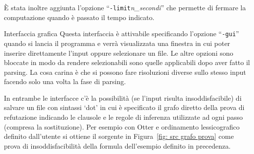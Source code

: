 \documentclass[a4paper,11pt]{article} %
\newcommand{\sintassi}{\texttt}
\begin{document}
\`E stata inoltre aggiunta l'opzione ``\sintassi{-limit}\emph{n\_secondi}'' che permette 
di fermare la computazione quando è passato il tempo indicato.


\begin{subsection}{Interfaccia grafica}\label{subsec: int. grafica}
Questa interfaccia è attivabile specificando l'opzione ``\sintassi{-gui}'' quando si
lancia il programma e verrà visualizzata una finestra in cui poter inserire
direttamente l'input oppure selezionare un file. Le altre opzioni sono bloccate
in modo da rendere selezionabili sono quelle applicabili dopo aver fatto il
parsing. La cosa carina è che si possono fare risoluzioni diverse sullo stesso 
input facendo solo una volta la fase di parsing.
\end{subsection}

In entrambe le interfacce c'è la possibilità (se l'input risulta insoddisfacibile)
di salvare un file con sintassi `dot' in cui è specificato il grafo diretto
della prova di refutazione indicando le clausole e le regole di inferenza 
utilizzate ad ogni passo (compresa la sostituzione).
Per esempio %
con Otter e ordinamento lessicografico definito dall'utente %
si ottiene il sorgente in Figura~\ref{fig: src grafo prova} come prova di insoddisfacibilità
della formula dell'esempio definito in precedenza.
\end{document}
